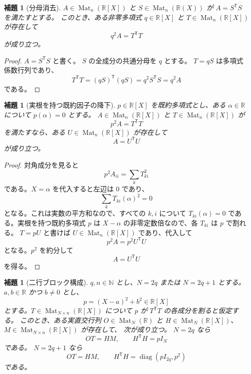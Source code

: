 \documentclass[uplatex,dvipdfmx]{jsarticle}
\newcommand{\Poly}{\mathbb{R}[X]}
\newcommand{\Frac}{\mathbb{R}(X)}
\newcommand{\Mat}{\operatorname{Mat}}
\theoremstyle{matrixsosdefinition}
\newtheorem{lemma}[theorem]{補題}
\begin{document}
\begin{lemma}[分母消去]\label{lem:clear-common-denominator}
  \(A\in\Mat_n(\Poly)\) と \(S\in\Mat_n(\Frac)\) が
  \(A=S^{\mathsf T}S\) を満たすとする。
  このとき、ある非零多項式 \(q\in\Poly\) と
  \(T\in\Mat_n(\Poly)\) が存在して
  \[
    q^2A=T^{\mathsf T}T
  \]
  が成り立つ。
\end{lemma}

\begin{proof}
  \(A=S^{\mathsf T}S\) と書く。
  \(S\) の全成分の共通分母を \(q\) とする。
  \(T=qS\) は多項式係数行列であり、
  \[
    T^{\mathsf T}T=(qS)^{\mathsf T}(qS)=q^2S^{\mathsf T}S=q^2A
  \]
  である。
\end{proof}

\begin{lemma}[実根を持つ既約因子の降下]\label{lem:real-root-factor-descent}
  \(p\in\Poly\) を既約多項式とし、ある \(\alpha\in\mathbb{R}\) について
  \(p(\alpha)=0\) とする。
  \(A\in\Mat_n(\Poly)\) と \(T\in\Mat_n(\Poly)\) が
  \[
    p^2A=T^{\mathsf T}T
  \]
  を満たすなら、ある \(U\in\Mat_n(\Poly)\) が存在して
  \[
    A=U^{\mathsf T}U
  \]
  が成り立つ。
\end{lemma}

\begin{proof}
  対角成分を見ると
  \[
    p^2A_{ii}=\sum_k T_{ki}^2
  \]
  である。\(X=\alpha\) を代入すると左辺は \(0\) であり、
  \[
    \sum_k T_{ki}(\alpha)^2=0
  \]
  となる。これは実数の平方和なので、すべての \(k,i\) について
  \(T_{ki}(\alpha)=0\) である。実根を持つ既約多項式 \(p\) は
  \(X-\alpha\) の非零定数倍なので、各 \(T_{ki}\) は \(p\) で割れる。
  \(T=pU\) と書けば
  \(U\in\Mat_n(\Poly)\) であり、代入して
  \[
    p^2A=p^2U^{\mathsf T}U
  \]
  となる。\(p^2\) を約分して
  \[
    A=U^{\mathsf T}U
  \]
  を得る。
\end{proof}

\begin{lemma}[二行ブロック構成]\label{lem:two-row-block-construction}
  \(q,n\in\mathbb{N}\) とし、\(N=2q\) または \(N=2q+1\) とする。
  \(a,b\in\mathbb{R}\) かつ \(b\ne0\) とし、
  \[
    p=(X-a)^2+b^2\in\Poly
  \]
  とする。\(T\in\Mat_{N\times n}(\Poly)\) について
  \(p\) が \(T^{\mathsf T}T\) の各成分を割ると仮定する。
  このとき、ある実直交行列 \(O\in\Mat_N(\mathbb{R})\) と
  \(H\in\Mat_N(\Poly)\)、\(M\in\Mat_{N\times n}(\Poly)\) が存在して、
  次が成り立つ。
  \(N=2q\) なら
  \[
    OT=HM,\qquad H^{\mathsf T}H=pI_N
  \]
  である。
  \(N=2q+1\) なら
  \[
    OT=HM,\qquad
    H^{\mathsf T}H=\operatorname{diag}(pI_{2q},p^2)
  \]
  である。
\end{lemma}
\end{document}
